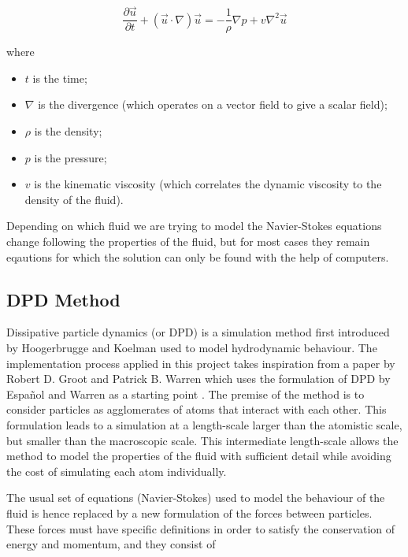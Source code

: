 \documentclass[]{usiinfbachelorproject}
\begin{document}
$$ \frac{\partial \vec{u}}{\partial t} + (\vec{u} \cdot \nabla) \vec{u} = - \frac{1}{\rho} \nabla p + v \nabla^2 \vec{u}$$

where 
\begin{itemize}
    \item $t$ is the time;
    \item $\nabla$ is the divergence (which operates on a vector field to give a scalar field);
    \item $\rho$ is the density;
    \item $p$ is the pressure;
    \item $v$ is the kinematic viscosity (which correlates the dynamic viscosity to the density of the fluid).
\end{itemize}

Depending on which fluid we are trying to model the Navier-Stokes equations change following the properties of the fluid, but for most cases 
they remain eqautions for which the solution can only be found with the help of computers.

\subsection{DPD Method}
Dissipative particle dynamics (or DPD) is a simulation method first introduced by Hoogerbrugge and Koelman \cite{Hoogerbrugge} used to 
model hydrodynamic behaviour. The implementation process applied in this project takes inspiration from a paper by 
Robert D. Groot and Patrick B. Warren \cite{Groot} which uses the formulation of DPD by Espa\~{n}ol and Warren as a starting point \cite{Warren}. 
The premise of the method is to consider particles as agglomerates 
of atoms that interact with each other. This formulation leads to a simulation at a length-scale larger 
than the atomistic scale, but smaller than the macroscopic scale. This intermediate length-scale allows the method to 
model the properties of the fluid with sufficient detail while avoiding the cost of simulating each atom individually.

The usual set of equations (Navier-Stokes) used to model the behaviour of the fluid is hence replaced by a new 
formulation of the forces between particles. These forces must have specific definitions in order to satisfy the conservation of 
energy and momentum, and they consist of 
\end{document}
